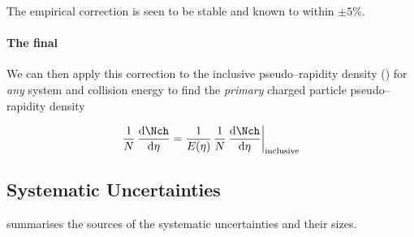 The empirical correction is seen to be stable and known to within
$\pm5\%$.  


\paragraph{The final \ndndeta{}}
We can then apply this correction to the inclusive pseudo--rapidity
density (\indndeta{}) for \emph{any} system and collision energy to
find the \emph{primary} charged particle pseudo--rapidity density

\begin{equation}
  \label{eq:empirical:applied}
  \ndndeta = \frac{1}{\EmpCor{}} \indndeta{}
\end{equation}

\subsection{Systematic Uncertainties}
\label{sec:sub:dndeta:syserr}

 summarises the sources of the systematic
uncertainties and their sizes.


